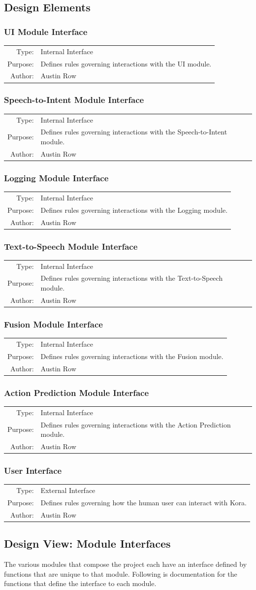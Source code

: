 \documentclass[onecolumn, draftclsnofoot,10pt, compsoc]{IEEEtran}
\def \botname{Kora\xspace}
\newcommand{\designElementDef}[4]{
    \subsubsection{#1}\label{#1}
        \begin{tabular}[t]{r p{6in}}
            Type: & #2 \\
            Purpose: & #3 \\
            Author: & #4 \\
        \end{tabular}
}
\begin{document}
    \subsection{Design Elements}
        \designElementDef{UI Module Interface}{Internal Interface}{Defines rules governing interactions with the UI module.}{Austin Row}
        \designElementDef{Speech-to-Intent Module Interface}{Internal Interface}{Defines rules governing interactions with the Speech-to-Intent module.}{Austin Row}
        \designElementDef{Logging Module Interface}{Internal Interface}{Defines rules governing interactions with the Logging module.}{Austin Row}
        \designElementDef{Text-to-Speech Module Interface}{Internal Interface}{Defines rules governing interactions with the Text-to-Speech module.}{Austin Row}
        \designElementDef{Fusion Module Interface}{Internal Interface}{Defines rules governing interactions with the Fusion module.}{Austin Row}
        \designElementDef{Action Prediction Module Interface}{Internal Interface}{Defines rules governing interactions with the Action Prediction module.}{Austin Row}
        \designElementDef{User Interface}{External Interface}{Defines rules governing how the human user can interact with \botname.}{Austin Row}
    \subsection{Design View: Module Interfaces}
        The various modules that compose the project each have an interface defined by functions that are unique to that module.
        Following is documentation for the functions that define the interface to each module.
\end{document}
